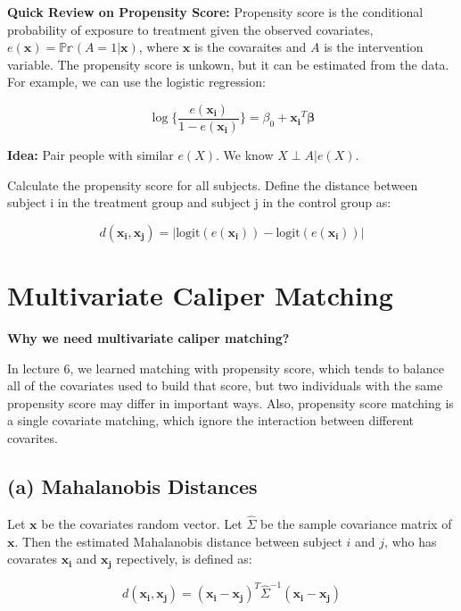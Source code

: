 \documentclass[
]{book}
\begin{document}
\textbf{Quick Review on Propensity Score:}
Propensity score is the conditional probability of exposure to treatment given the observed covariates, \(e(\mathbf{x}) = \mathbb{Pr}(A = 1|\mathbf{x})\), where \(\mathbf{x}\) is the covaraites and \(A\) is the intervention variable. The propensity score is unkown, but it can be estimated from the data. For example, we can use the logistic regression:

\[\log\{\frac{e(\mathbf{x_i})}{1 - e(\mathbf{x_i})}\} = \beta_0 + \mathbf{x_i}^T\mathbf{\beta}\]

\textbf{Idea:} Pair people with similar \(e(X)\). We know \(X \perp A | e(X)\).

Calculate the propensity score for all subjects. Define the distance between subject i in the treatment group and subject j in the control group as:

\[d(\mathbf{x_i}, \mathbf{x_j}) = \big|\text{logit}(e(\mathbf{x_i})) - \text{logit}(e(\mathbf{x_i}))\big|\]

\hypertarget{multivariate-caliper-matching}{%
\section{Multivariate Caliper Matching}\label{multivariate-caliper-matching}}

\textbf{Why we need multivariate caliper matching?}

In lecture 6, we learned matching with propensity score, which tends to balance all of the covariates used to build that score, but two individuals with the same propensity score may differ in important ways. Also, propensity score matching is a single covariate matching, which ignore the interaction between different covarites.

\hypertarget{a-mahalanobis-distances}{%
\subsection{(a) Mahalanobis Distances}\label{a-mahalanobis-distances}}

Let \(\mathbf{x}\) be the covariates random vector. Let \(\hat{\Sigma}\) be the sample covariance matrix of \(\mathbf{x}\). Then the estimated Mahalanobis distance between subject \(i\) and \(j\), who has covarates \(\mathbf{x_i}\) and \(\mathbf{x_j}\) repectively, is defined as:

\[d(\mathbf{x_i}, \mathbf{x_j}) = (\mathbf{x_i} - \mathbf{x_j})^T\hat{\Sigma}^{-1}(\mathbf{x_i} - \mathbf{x_j})\]
\end{document}
